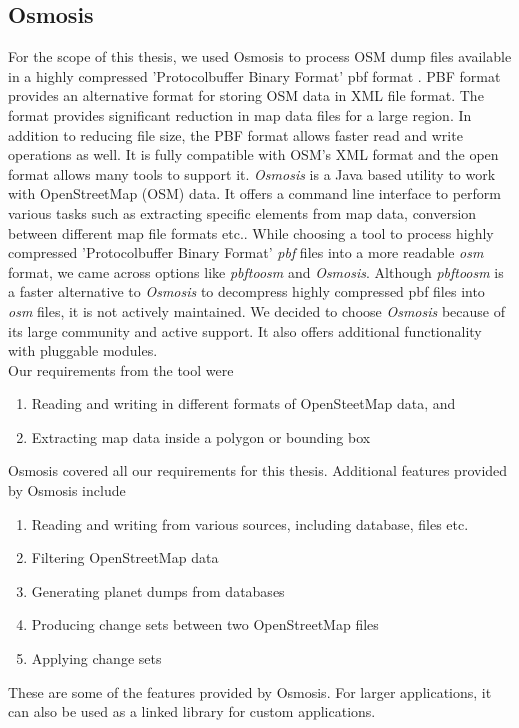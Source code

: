 \subsection{Osmosis} \label{osmosis}
For the scope of this thesis, we used Osmosis to process OSM dump files available in a highly compressed 'Protocolbuffer Binary Format' pbf format \cite{osmpbf}. PBF format provides an alternative format for storing OSM data in XML file format. The format provides significant reduction in map data files for a large region. In addition to reducing file size, the PBF format allows faster read and write operations as well. It is fully compatible with OSM's XML format and the open format allows many tools to support it. \textit{Osmosis} \cite{osmosis} is a Java based utility to work with OpenStreetMap (OSM) data. It offers a command line interface to perform various tasks such as extracting specific elements from map data, conversion between different map file formats etc.. While choosing a tool to process highly compressed 'Protocolbuffer Binary Format' \textit{pbf} files into a more readable \textit{osm} format, we came across options like \textit{pbftoosm} \cite{pbftoosm} and \textit{Osmosis}. Although \textit{pbftoosm} is a faster alternative \cite{pbftoosm} to \textit{Osmosis} to decompress highly compressed pbf files into \textit{osm} files, it is not actively maintained. We decided to choose \textit{Osmosis} because of its large community and active support. It also offers additional functionality with pluggable modules. \\

Our requirements from the tool were
\begin{enumerate}
\item Reading and writing in different formats of OpenSteetMap data, and
\item Extracting map data inside a polygon or bounding box
\end{enumerate}
Osmosis covered all our requirements for this thesis. Additional features provided by Osmosis include \begin{enumerate}
\item Reading and writing from various sources, including database, files etc.
\item Filtering OpenStreetMap data
\item Generating planet dumps from databases
\item Producing change sets between two OpenStreetMap files
\item Applying change sets 
\end{enumerate} 
These are some of the features provided by Osmosis. For larger applications, it can also be used as a linked library for custom applications.\\ 

